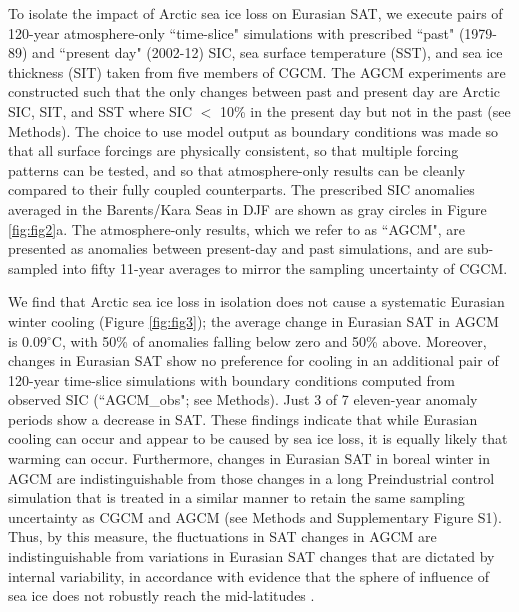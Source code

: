 \documentclass{nature}
\begin{document}
To isolate the impact of Arctic sea ice loss on Eurasian SAT, we execute pairs of 120-year atmosphere-only ``time-slice" simulations with prescribed ``past" (1979-89) and ``present day" (2002-12) SIC, sea surface temperature (SST), and sea ice thickness (SIT) taken from five members of CGCM. The AGCM experiments are constructed such that the only changes between past and present day are Arctic SIC, SIT, and SST where SIC $<$ 10\% in the present day but not in the past (see Methods). The choice to use model output as boundary conditions was made so that all surface forcings are physically consistent, so that multiple forcing patterns can be tested, and so that atmosphere-only results can be cleanly compared to their fully coupled counterparts. The prescribed SIC anomalies averaged in the Barents/Kara Seas in DJF are shown as gray circles in Figure \ref{fig:fig2}a. The atmosphere-only results, which we refer to as ``AGCM", are presented as anomalies between present-day and past simulations, and are sub-sampled into fifty 11-year averages to mirror the sampling uncertainty of CGCM. %

We find that Arctic sea ice loss in isolation does not cause a systematic Eurasian winter cooling (Figure \ref{fig:fig3}); the average change in Eurasian SAT in AGCM is 0.09$^\circ$C, with 50\% of anomalies falling below zero and 50\% above. Moreover, changes in Eurasian SAT show no preference for cooling in an additional pair of 120-year time-slice simulations with boundary conditions computed from observed SIC (``AGCM\_obs"; see Methods). Just 3 of 7 eleven-year anomaly periods show a decrease in SAT. These findings indicate that while Eurasian cooling can occur and appear to be caused by sea ice loss, it is equally likely that warming can occur. Furthermore, changes in Eurasian SAT in boreal winter in AGCM are indistinguishable from those changes in a long Preindustrial control simulation that is treated in a similar manner to retain the same sampling uncertainty as CGCM and AGCM (see Methods and Supplementary Figure S1). Thus, by this measure, the fluctuations in SAT changes in AGCM are indistinguishable from variations in Eurasian SAT changes that are dictated by internal variability, in accordance with evidence that the sphere of influence of sea ice does not robustly reach the mid-latitudes \cite{screen14a}. %
\end{document}

